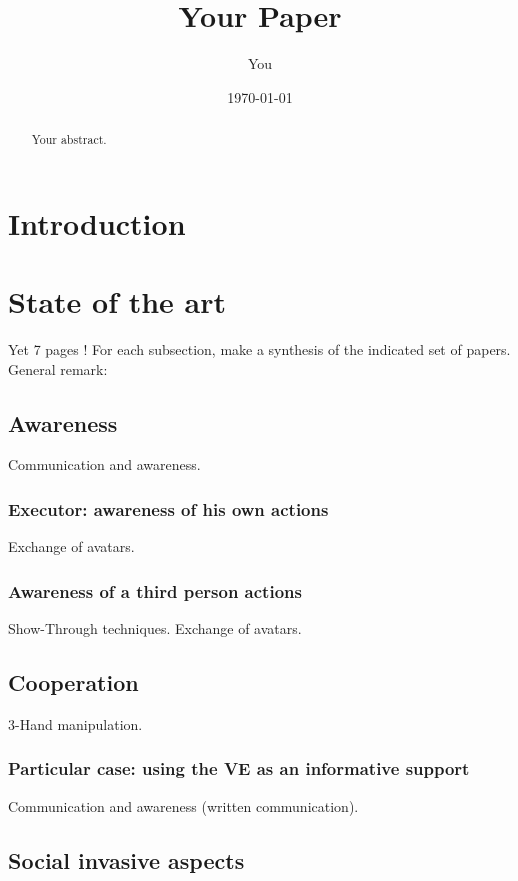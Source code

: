 \documentclass[a4paper]{article}
\title{Your Paper}
\author{You}
\date{\today}
\begin{document}
\maketitle

\begin{abstract}
Your abstract.
\end{abstract}

\tableofcontents

\section{Introduction}

\section{State of the art}
Yet 7 pages !
For each subsection, make a synthesis of the indicated set of papers.
General remark: 

\subsection{Awareness}
Communication and awareness.

\subsubsection{Executor: awareness of his own actions}
Exchange of avatars.

\subsubsection{Awareness of a third person actions}
Show-Through techniques.
Exchange of avatars.

\subsection{Cooperation}

3-Hand manipulation.

\subsubsection{Particular case: using the VE as an informative support}
Communication and awareness (written communication).

\subsection{Social invasive aspects}
\end{document}
